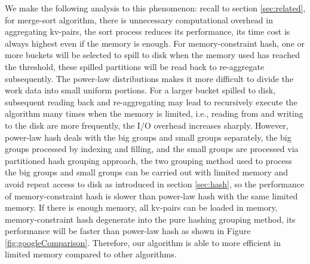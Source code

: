 We make the following analysis to this phenomenon: recall to section \ref{sec:related}, for merge-sort algorithm, there is unnecessary computational overhead in aggregating kv-pairs, the sort process reduces its performance, its time cost is always highest even if the memory is enough. For memory-constraint hash, one or more buckets will be selected to spill to disk when the memory used has reached the threshold, these spilled partitions will be read back to re-aggregate subsequently. The power-law distributions makes it more difficult to divide the work data into small uniform portions. For a larger bucket spilled to disk, subsequent reading back and re-aggregating may lead to recursively execute the algorithm many times when the memory is limited, i.e., reading from and writing to the disk are more frequently, the I/O overhead increases sharply. However, power-law hash deals with the big groups and small groups separately, the big groups processed by indexing and filling, and the small groups are processed via partitioned hash grouping approach, the two grouping method used to process the big groups and small groups can be carried out with limited memory and avoid repeat access to disk as introduced in section \ref{sec:hash}, so the performance of memory-constraint hash is slower than power-law hash with the same limited memory. If there is enough memory, all kv-pairs can be loaded in memory, memory-constraint hash degenerate into the pure hashing grouping method, its performance will be faster than power-law hash as shown in Figure \ref{fig:googleComparison}. Therefore, our algorithm is able to more efficient in limited memory compared to other algorithms.

